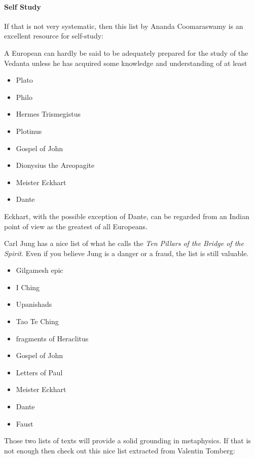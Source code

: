 \paragraph{Self Study}
If that is not very systematic, then this list by Ananda Coomaraswamy is an excellent resource for self-study:

\begin{quotex}
A European can hardly be said to be adequately prepared for the study of the Vedanta unless he has acquired some knowledge and understanding of at least

\begin{itemize}[nosep]
\item Plato 
\item Philo 
\item Hermes Trismegistus 
\item Plotinus 
\item Gospel of John 
\item Dionysius the Areopagite 
\item Meister Eckhart 
\item Dante 
\end{itemize}

Eckhart, with the possible exception of Dante, can be regarded from an Indian point of view as the greatest of all Europeans. 

\end{quotex}
Carl Jung has a nice list of what he calls the \textit{Ten Pillars of the Bridge of the Spirit}. Even if you believe Jung is a danger or a fraud, the list is still valuable.

\begin{itemize}[nosep]
\item Gilgamesh epic 
\item I Ching 
\item Upanishads 
\item Tao Te Ching 
\item fragments of Heraclitus 
\item Gospel of John 
\item Letters of Paul 
\item Meister Eckhart 
\item Dante 
\item Faust 
\end{itemize}

\phantom{.}

Those two lists of texts will provide a solid grounding in metaphysics. If that is not enough then check out this nice list extracted from Valentin Tomberg:

